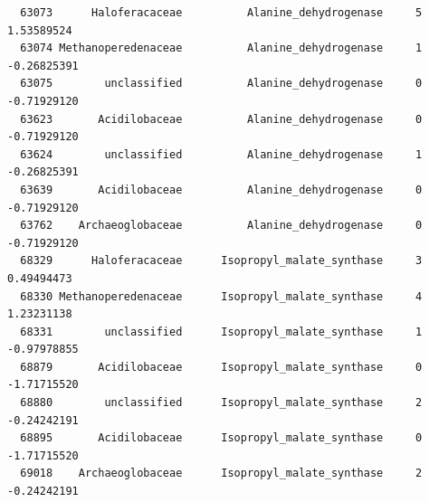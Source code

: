 \documentclass[12pt,twoside]{reedthesis}
\begin{document}
\begin{verbatim}
  63073      Haloferacaceae          Alanine_dehydrogenase     5  1.53589524
  63074 Methanoperedenaceae          Alanine_dehydrogenase     1 -0.26825391
  63075        unclassified          Alanine_dehydrogenase     0 -0.71929120
  63623       Acidilobaceae          Alanine_dehydrogenase     0 -0.71929120
  63624        unclassified          Alanine_dehydrogenase     1 -0.26825391
  63639       Acidilobaceae          Alanine_dehydrogenase     0 -0.71929120
  63762    Archaeoglobaceae          Alanine_dehydrogenase     0 -0.71929120
  68329      Haloferacaceae      Isopropyl_malate_synthase     3  0.49494473
  68330 Methanoperedenaceae      Isopropyl_malate_synthase     4  1.23231138
  68331        unclassified      Isopropyl_malate_synthase     1 -0.97978855
  68879       Acidilobaceae      Isopropyl_malate_synthase     0 -1.71715520
  68880        unclassified      Isopropyl_malate_synthase     2 -0.24242191
  68895       Acidilobaceae      Isopropyl_malate_synthase     0 -1.71715520
  69018    Archaeoglobaceae      Isopropyl_malate_synthase     2 -0.24242191
  \end{verbatim}
  
\end{document}
